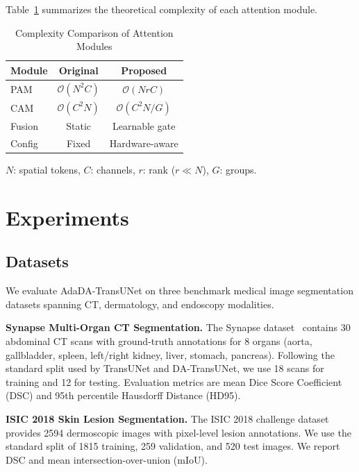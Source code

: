 \documentclass[conference]{IEEEtran}
\begin{document}
Table~\ref{tab:complexity} summarizes the theoretical complexity of each attention module.

\begin{table}[t]
  \caption{Complexity Comparison of Attention Modules}
  \label{tab:complexity}
  \begin{center}
  \begin{tabular}{lcc}
    \toprule
    Module & Original & Proposed \\
    \midrule
    PAM & $\mathcal{O}(N^2 C)$ & $\mathcal{O}(N r C)$ \\
    CAM & $\mathcal{O}(C^2 N)$ & $\mathcal{O}(C^2 N / G)$ \\
    Fusion & Static & Learnable gate \\
    Config & Fixed & Hardware-aware \\
    \bottomrule
  \end{tabular}
  \end{center}
  \vspace{-0.5em}
  \footnotesize{$N$: spatial tokens, $C$: channels, $r$: rank ($r \ll N$), $G$: groups.}
\end{table}


\section{Experiments}

\subsection{Datasets}

We evaluate AdaDA-TransUNet on three benchmark medical image segmentation datasets spanning CT, dermatology, and endoscopy modalities.

\textbf{Synapse Multi-Organ CT Segmentation.} The Synapse dataset~\cite{landman2015miccai} contains 30 abdominal CT scans with ground-truth annotations for 8 organs (aorta, gallbladder, spleen, left/right kidney, liver, stomach, pancreas). Following the standard split used by TransUNet and DA-TransUNet, we use 18 scans for training and 12 for testing. Evaluation metrics are mean Dice Score Coefficient (DSC) and 95th percentile Hausdorff Distance (HD95).

\textbf{ISIC 2018 Skin Lesion Segmentation.} The ISIC 2018 challenge dataset~\cite{codella2019isic} provides 2594 dermoscopic images with pixel-level lesion annotations. We use the standard split of 1815 training, 259 validation, and 520 test images. We report DSC and mean intersection-over-union (mIoU).
\end{document}
